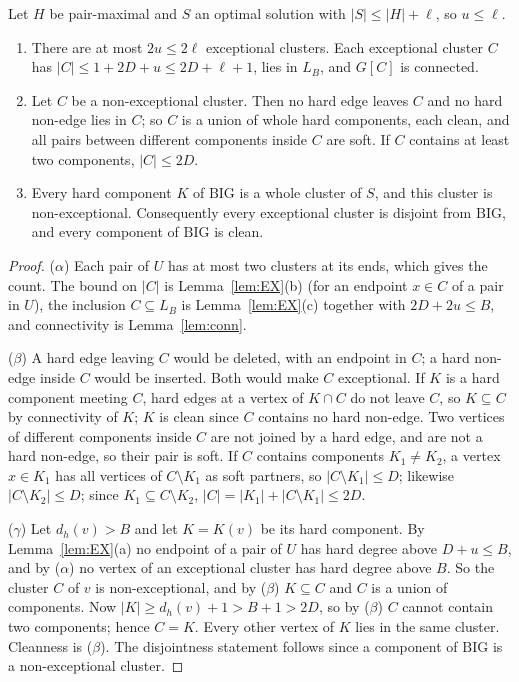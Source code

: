 \begin{lemma}\label{lem:NF}
Let $H$ be pair-maximal and $S$ an optimal solution with $|S|\le|H|+\ell$, so $u\le\ell$.
\begin{enumerate}
\item[($\alpha$)] There are at most $2u\le2\ell$ exceptional clusters. Each exceptional cluster $C$ has $|C|\le1+2D+u\le2D+\ell+1$, lies in $L_B$, and $G[C]$ is connected.
\item[($\beta$)] Let $C$ be a non-exceptional cluster. Then no hard edge leaves $C$ and no hard non-edge lies in $C$; so $C$ is a union of whole hard components, each clean, and all pairs between different components inside $C$ are soft. If $C$ contains at least two components, $|C|\le2D$.
\item[($\gamma$)] Every hard component $K$ of $\mathrm{BIG}$ is a whole cluster of $S$, and this cluster is non-exceptional. Consequently every exceptional cluster is disjoint from $\mathrm{BIG}$, and every component of $\mathrm{BIG}$ is clean.
\end{enumerate}
\end{lemma}
\begin{proof}
($\alpha$) Each pair of $U$ has at most two clusters at its ends, which gives the count. The bound on $|C|$ is Lemma~\ref{lem:EX}(b) (for an endpoint $x\in C$ of a pair in $U$), the inclusion $C\subseteq L_B$ is Lemma~\ref{lem:EX}(c) together with $2D+2u\le B$, and connectivity is Lemma~\ref{lem:conn}.

($\beta$) A hard edge leaving $C$ would be deleted, with an endpoint in $C$; a hard non-edge inside $C$ would be inserted. Both would make $C$ exceptional. If $K$ is a hard component meeting $C$, hard edges at a vertex of $K\cap C$ do not leave $C$, so $K\subseteq C$ by connectivity of $K$; $K$ is clean since $C$ contains no hard non-edge. Two vertices of different components inside $C$ are not joined by a hard edge, and are not a hard non-edge, so their pair is soft. If $C$ contains components $K_1\ne K_2$, a vertex $x\in K_1$ has all vertices of $C\setminus K_1$ as soft partners, so $|C\setminus K_1|\le D$; likewise $|C\setminus K_2|\le D$; since $K_1\subseteq C\setminus K_2$, $|C|=|K_1|+|C\setminus K_1|\le2D$.

($\gamma$) Let $d_h(v)>B$ and let $K=K(v)$ be its hard component. By Lemma~\ref{lem:EX}(a) no endpoint of a pair of $U$ has hard degree above $D+u\le B$, and by ($\alpha$) no vertex of an exceptional cluster has hard degree above $B$. So the cluster $C$ of $v$ is non-exceptional, and by ($\beta$) $K\subseteq C$ and $C$ is a union of components. Now $|K|\ge d_h(v)+1>B+1>2D$, so by ($\beta$) $C$ cannot contain two components; hence $C=K$. Every other vertex of $K$ lies in the same cluster. Cleanness is ($\beta$). The disjointness statement follows since a component of $\mathrm{BIG}$ is a non-exceptional cluster.
\end{proof}

